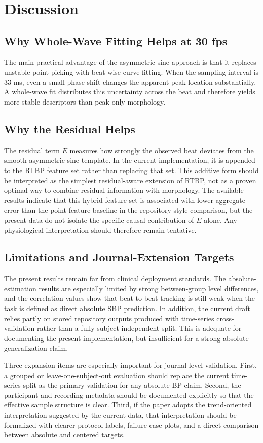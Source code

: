 \documentclass[twocolumn]{svjour3}
\begin{document}
\section{Discussion}
\subsection{Why Whole-Wave Fitting Helps at 30 fps}
The main practical advantage of the asymmetric sine approach is that it replaces unstable point picking with beat-wise curve fitting. When the sampling interval is 33 ms, even a small phase shift changes the apparent peak location substantially. A whole-wave fit distributes this uncertainty across the beat and therefore yields more stable descriptors than peak-only morphology.

\subsection{Why the Residual Helps}
The residual term $E$ measures how strongly the observed beat deviates from the smooth asymmetric sine template. In the current implementation, it is appended to the RTBP feature set rather than replacing that set. This additive form should be interpreted as the simplest residual-aware extension of RTBP, not as a proven optimal way to combine residual information with morphology. The available results indicate that this hybrid feature set is associated with lower aggregate error than the point-feature baseline in the repository-style comparison, but the present data do not isolate the specific causal contribution of $E$ alone. Any physiological interpretation should therefore remain tentative.

\subsection{Limitations and Journal-Extension Targets}
The present results remain far from clinical deployment standards. The absolute-estimation results are especially limited by strong between-group level differences, and the correlation values show that beat-to-beat tracking is still weak when the task is defined as direct absolute SBP prediction. In addition, the current draft relies partly on stored repository outputs produced with time-series cross-validation rather than a fully subject-independent split. This is adequate for documenting the present implementation, but insufficient for a strong absolute-generalization claim.

Three expansion items are especially important for journal-level validation. First, a grouped or leave-one-subject-out evaluation should replace the current time-series split as the primary validation for any absolute-BP claim. Second, the participant and recording metadata should be documented explicitly so that the effective sample structure is clear. Third, if the paper adopts the trend-oriented interpretation suggested by the current data, that interpretation should be formalized with clearer protocol labels, failure-case plots, and a direct comparison between absolute and centered targets.
\end{document}
